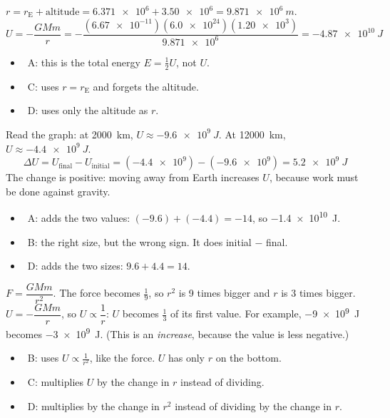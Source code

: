 \documentclass[12pt]{article}
\begin{document}
\begin{practiceanswers}
\begin{practiceans}
  $r = r_\mathrm{E} + \text{altitude} = \num{6.371e6} + \num{3.50e6} = \qty{9.871e6}{m}$.
  \[ U = -\frac{GMm}{r} = -\frac{(\num{6.67e-11})(\num{6.0e24})(\num{1.20e3})}{\num{9.871e6}}
       = \qty{-4.87e10}{J} \]
  \begin{itemize}
    \item \xmark\ A: this is the total energy $E = \frac{1}{2}U$, not $U$.
    \item \xmark\ C: uses $r = r_\mathrm{E}$ and forgets the altitude.
    \item \xmark\ D: uses only the altitude as $r$.
  \end{itemize}
\end{practiceans}

\begin{practiceans}
  Read the graph: at \qty{2000}{km}, $U \approx \qty{-9.6e9}{J}$. At \qty{12000}{km},
  $U \approx \qty{-4.4e9}{J}$.
  \[ \Delta U = U_\mathrm{final} - U_\mathrm{initial} = (\num{-4.4e9}) - (\num{-9.6e9})
     = \qty[retain-explicit-plus]{+5.2e9}{J} \]
  The change is positive: moving away from Earth increases $U$, because work must be done against
  gravity.
  \begin{itemize}
    \item \xmark\ A: adds the two values: $(-9.6) + (-4.4) = -14$, so \qty{-1.4e10}{J}.
    \item \xmark\ B: the right size, but the wrong sign. It does initial $-$ final.
    \item \xmark\ D: adds the two sizes: $9.6 + 4.4 = 14$.
  \end{itemize}
\end{practiceans}

\begin{practiceans}
  $F = \dfrac{GMm}{r^2}$. The force becomes $\frac{1}{9}$, so $r^2$ is 9 times bigger and $r$ is
  3 times bigger. $U = -\dfrac{GMm}{r}$, so $U \propto \dfrac{1}{r}$: $U$ becomes $\frac{1}{3}$ of
  its first value. For example, \qty{-9e9}{J} becomes \qty{-3e9}{J}. (This is an
  \emph{increase}, because the value is less negative.)
  \begin{itemize}
    \item \xmark\ B: uses $U \propto \frac{1}{r^2}$, like the force. $U$ has only $r$ on the bottom.
    \item \xmark\ C: multiplies $U$ by the change in $r$ instead of dividing.
    \item \xmark\ D: multiplies by the change in $r^2$ instead of dividing by the change in $r$.
  \end{itemize}
\end{practiceans}


\end{practiceanswers}
\end{document}

